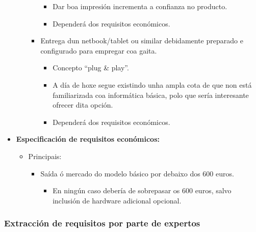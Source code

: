 \begin{itemize}
\begin{itemize}
\begin{itemize}
                       \begin{itemize}
                        \item Dar boa impresión incrementa a confianza no
                              producto.
                        \item Dependerá dos requisitos económicos.
                       \end{itemize}
                 \item Entrega dun netbook/tablet ou similar debidamente
                       preparado e configurado para empregar coa gaita.
                       \begin{itemize}
                        \item Concepto ``plug \& play''.
                        \item A día de hoxe segue existindo unha ampla cota de
                              que non está familiarizada coa informática
                              básica, polo que sería interesante ofrecer dita
                              opción.
                        \item Dependerá dos requisitos económicos.
                       \end{itemize}
                \end{itemize}
         \end{itemize}
   \item \textbf{Especificación de requisitos económicos:}
         \begin{itemize}
          \item Principais:
                \begin{itemize}
                 \item Saída ó mercado do modelo básico por debaixo dos 600
                       euros.
                       \begin{itemize}
                        \item En ningún caso debería de sobrepasar os 600
                              euros, salvo inclusión de hardware adicional
                              opcional.
                       \end{itemize}
                \end{itemize}
         \end{itemize}
  \end{itemize}

  \subsubsection{Extracción de requisitos por parte de expertos}

